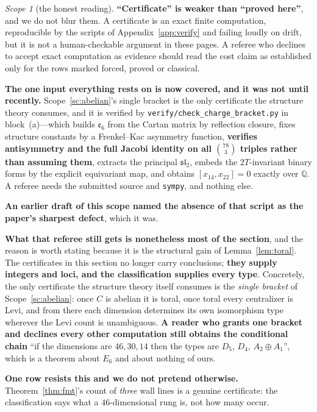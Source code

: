 \documentclass[11pt,reqno]{amsart}
\theoremstyle{plain}
\theoremstyle{definition}
\theoremstyle{remark}
\newtheorem{scope}[theorem]{Scope}
\newcommand{\Q}{\mathbb{Q}}
\newcommand{\sll}{\mathfrak{sl}}
\newcommand{\ee}{\mathfrak{e}}
\begin{document}
\begin{scope}[the honest reading]\label{sc:audit}
\textbf{``Certificate'' is weaker than ``proved here''}, and we do not blur them. A
certificate is an exact finite computation, reproducible by the scripts of
Appendix~\ref{app:verify} and failing loudly on drift, but it is not a human-checkable
argument in these pages. A referee who declines to accept exact computation as evidence
should read the cost claim as established only for the rows marked forced, proved or
classical.

\textbf{The one input everything rests on is now covered, and it was not until
recently.} Scope~\ref{sc:abelian}'s single bracket is the only certificate the structure
theory consumes, and it is verified by \texttt{verify/check\_charge\_bracket.py} in
block~(a)---which builds $\ee_6$ from the Cartan matrix by reflection closure, fixes
structure constants by a Frenkel--Kac asymmetry function, \textbf{verifies antisymmetry
and the full Jacobi identity on all $\binom{78}{3}$ triples rather than assuming them},
extracts the principal $\sll_2$, embeds the $2T$-invariant binary forms by the explicit
equivariant map, and obtains $[x_{14},x_{22}]=0$ exactly over $\Q$. A referee needs the
submitted source and \texttt{sympy}, and nothing else.

\textbf{An earlier draft of this scope named the absence of that script as the paper's
sharpest defect}, which it was.

\textbf{What that referee still gets is nonetheless most of the section}, and the reason
is worth stating because it is the structural gain of Lemma~\ref{lem:toral}. The
certificates in this section no longer carry conclusions; \textbf{they supply integers
and loci, and the classification supplies every type}. Concretely, the only certificate
the structure theory itself consumes is the \emph{single bracket} of
Scope~\ref{sc:abelian}: once $C$ is abelian it is toral, once toral every centralizer is
Levi, and from there each dimension determines its own isomorphism type wherever the
Levi count is unambiguous. \textbf{A reader who grants one bracket and declines every
other computation still obtains the conditional chain} ``if the dimensions are
$46,30,14$ then the types are $D_5$, $D_4$, $A_2{\oplus}A_1$'', which is a theorem about
$E_6$ and about nothing of ours.

\textbf{One row resists this and we do not pretend otherwise.}
Theorem~\ref{thm:fmt}'s count of \emph{three} wall lines is a genuine certificate: the
classification says what a $46$-dimensional rung is, not how many occur.
\end{scope}
\end{document}
